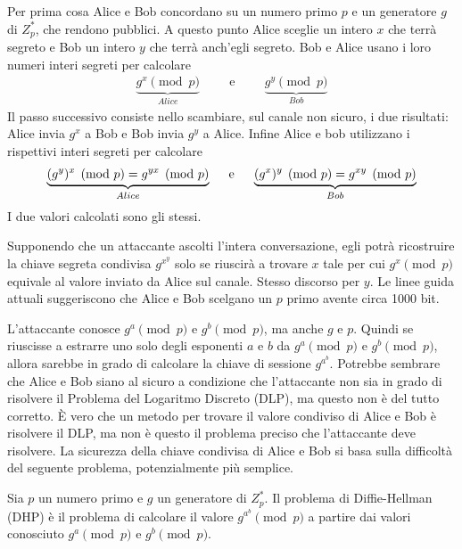 Per prima cosa Alice e Bob concordano su un numero primo $p$ e un generatore $g$ di $Z_p^*$, che rendono pubblici. 
A questo punto Alice sceglie un intero $x$ che terrà segreto e Bob un intero $y$ che terrà anch'egli segreto. Bob e Alice usano i loro numeri interi segreti per calcolare
\begin{align*}
     	\underbrace{g^x \pmod{p}}_{Alice} \hspace{1cm}\text{e}\hspace{1cm} \underbrace{g^y \pmod{p}}_{Bob}
\end{align*}
\noindent Il passo successivo consiste nello scambiare, sul canale non sicuro, i due risultati: Alice invia $g^x$ a Bob e Bob invia $g^y$ a Alice. Infine Alice e bob utilizzano i rispettivi interi segreti per calcolare
\begin{align*}
     	\underbrace{(g^y)^x \pmod{p} = g^{yx} \pmod{p}}_{Alice} \hspace{0.5cm}\text{e}\hspace{0.5cm} \underbrace{(g^x)^y \pmod{p} = g^{xy} \pmod{p}}_{Bob}
\end{align*}
\noindent I due valori calcolati sono gli stessi.

\noindent Supponendo che un attaccante ascolti l'intera conversazione, egli potrà ricostruire la chiave segreta condivisa $g^x^y$ solo se riuscirà a trovare $x$ tale per cui $g^x \pmod p$ equivale al valore inviato da Alice sul canale. Stesso discorso per $y$. Le linee guida attuali suggeriscono che Alice e Bob scelgano un $p$ primo avente circa 1000 bit.

L'attaccante conosce $g^a \pmod{p}$ e $g^b \pmod{p}$, ma anche $g$ e $p$. Quindi se riuscisse a estrarre uno solo degli esponenti $a$ e $b$ da $g^a \pmod{p}$ e $g^b \pmod{p}$, allora sarebbe in grado di calcolare la chiave di sessione $g^a^b$. Potrebbe sembrare che Alice e Bob siano al sicuro a condizione che l'attaccante non sia in grado di risolvere il Problema del Logaritmo Discreto (DLP), ma questo non è del tutto corretto. È vero che un metodo per trovare il valore condiviso di Alice e Bob è risolvere il DLP, ma non è questo il problema preciso che l'attaccante deve risolvere. La sicurezza della chiave condivisa di Alice e Bob si basa sulla difficoltà del seguente problema, potenzialmente più semplice.

\begin{definition}
Sia \(p\) un numero primo e \(g\) un generatore di \(Z_p^*\). Il problema di Diffie-Hellman (DHP) è il problema di calcolare il valore \(g^a^b \pmod p\) a partire dai valori conosciuto \(g^a \pmod p\) e \(g^b \pmod p\).
\end{definition}

